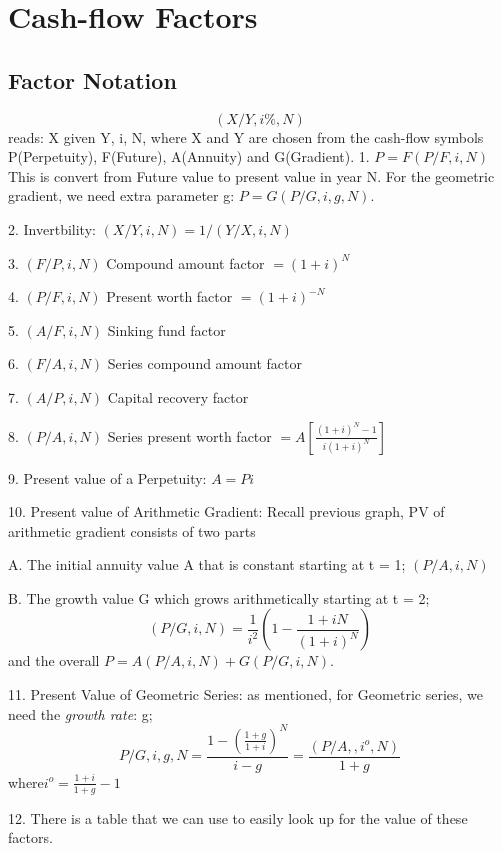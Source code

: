\documentclass{article}
\begin{document}
\section*{Cash-flow Factors}
\subsection*{Factor Notation}

\[(X/Y, i\%, N)\] reads: X given Y, i, N, where X and Y are chosen from the cash-flow symbols P(Perpetuity), F(Future), A(Annuity) and G(Gradient).
1. $P = F(P/F,i,N)$ This is convert from Future value to present value in year N. For the geometric gradient, we need extra parameter g: $P = G(P/G,i,g,N)$. 

2. Invertbility: $(X/Y,i,N) = 1/(Y/X,i,N)$

3. $(F/P,i,N)$ Compound amount factor $= (1+i)^N$

4. $(P/F,i,N)$ Present worth factor $= (1+i)^{-N}$

5. $(A/F,i,N)$ Sinking fund factor 

6. $(F/A,i,N)$ Series compound amount factor

7. $(A/P,i,N)$ Capital recovery factor 

8. $(P/A,i,N)$ Series present worth factor $= A[\frac{(1+i)^N-1}{i(1+i)^N}]$

9. Present value of a Perpetuity: $A = Pi$

10. Present value of Arithmetic Gradient: Recall previous graph, PV of arithmetic gradient consists of two parts

A. The initial annuity value A that is constant starting at t = 1; $(P/A,i,N)$

B. The growth value G which grows arithmetically starting at t = 2; 
\[ (P/G,i,N) = \frac{1}{i^2}(1-\frac{1+iN}{(1+i)^N})\]
and the overall $P = A(P/A,i,N)+ G(P/G,i,N)$. 

11. Present Value of Geometric Series: as mentioned, for Geometric series, we need the \emph{growth rate}: g;
\[P/G,i,g,N = \frac{1 - (\frac{1+g}{1+i})^N}{i-g} = \frac{(P/A,,i^o,N)}{1+g}\]
where$i^o = \frac{1+i}{1+g} - 1$

12. There is a table that we can use to easily look up for the value of these factors.
\end{document}
